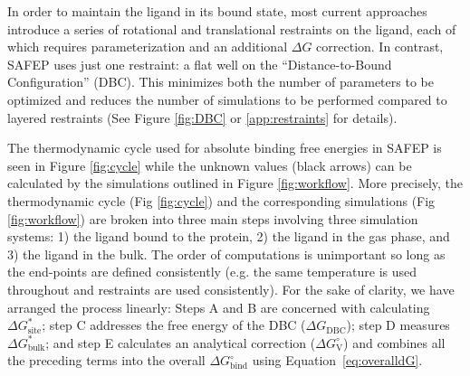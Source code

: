 \documentclass[9pt,tutorial]{Styling/livecoms}
\begin{document}
In order to maintain the ligand in its bound state, most current approaches introduce a series of rotational and translational restraints on the ligand, each of which requires parameterization and an additional $\Delta G$ correction.
In contrast, SAFEP uses just one restraint: a flat well on the ``Distance-to-Bound Configuration'' (DBC). This minimizes both the number of parameters to be optimized and reduces the number of simulations to be performed compared to layered restraints (See Figure \ref{fig:DBC} or \ref{app:restraints} for details).

The thermodynamic cycle used for absolute binding free energies in SAFEP is seen in Figure \ref{fig:cycle} while the unknown values (black arrows) can be calculated by the simulations outlined in Figure \ref{fig:workflow}.
More precisely, the thermodynamic cycle (Fig \ref{fig:cycle}) and the corresponding simulations (Fig \ref{fig:workflow}) are broken into three main steps involving three simulation systems: 1) the ligand bound to the protein, 2) the ligand in the gas phase, and 3) the ligand in the bulk. 
The order of computations is unimportant so long as the end-points are defined consistently (e.g. the same temperature is used throughout and restraints are used consistently). 
For the sake of clarity, we have arranged the process linearly: Steps A and B are concerned with calculating $\Delta G^*_\mathrm{site}$; step C addresses the free energy of the DBC ($\Delta G_\mathrm{DBC}$); step D measures $\Delta G^*_\mathrm{bulk}$; and step E calculates an analytical correction ($\Delta G^\circ_\mathrm{V}$) and combines all the preceding terms into the overall $\Delta G^\circ_\mathrm{bind}$ using Equation~\ref{eq:overalldG}.


\end{document}
